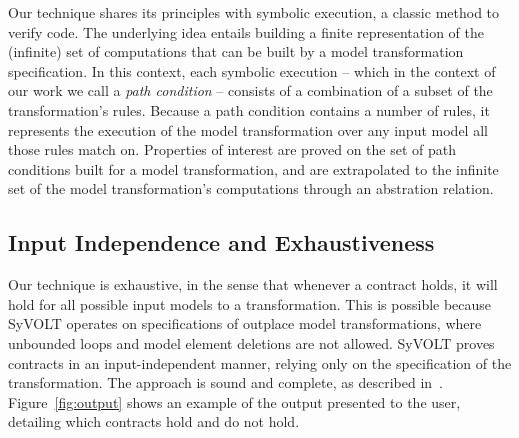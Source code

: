 Our technique shares its principles with symbolic execution, a classic method to
verify code. The underlying idea entails building a finite representation of the
(infinite) set of computations that can be built by a model transformation
specification. In this context, each symbolic execution -- which in the context
of our work we call a \emph{path condition} -- consists of a combination
of a subset of the transformation's rules.
Because a path condition contains a number of rules, it represents the execution
of the model transformation over any input model all those rules match on.
Properties of interest are proved on the set of path conditions built for a
model transformation, and are extrapolated to the infinite set of
the model transformation's computations through an abstration relation.






\subsection{Input Independence and Exhaustiveness} 

Our technique is exhaustive, in the sense that whenever a contract holds, it
will hold for all possible input models to a transformation. This is possible
because SyVOLT operates on specifications of outplace model transformations,
where unbounded loops and model element deletions are not allowed. SyVOLT proves
contracts in an input-independent manner, relying only on the specification of the
transformation. The approach is sound and complete, as described
in~\cite{Lucio2014}.  Figure~\ref{fig:output} shows an example of the output presented to the user, detailing which contracts hold and do not hold.

